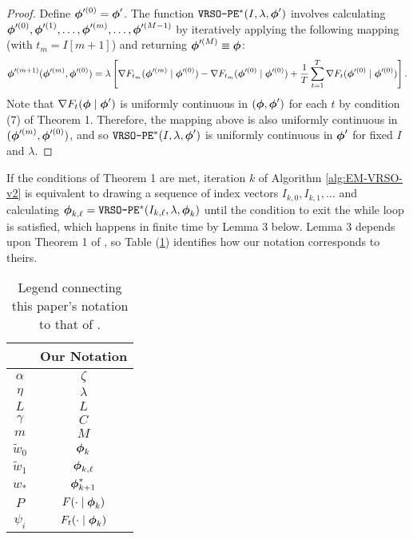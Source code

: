 \begin{proof}
    Define $\boldsymbol{\phi}'^{(0)} = \boldsymbol{\phi}'$. The function $\texttt{VRSO-PE}^*(I,\lambda,\boldsymbol{\phi}')$ involves calculating $\boldsymbol{\phi}'^{(0)}, \boldsymbol{\phi}'^{(1)}, \ldots, \boldsymbol{\phi}'^{(m)}, \ldots, \boldsymbol{\phi}'^{(M-1)}$ by iteratively applying the following mapping (with $t_m = I[m+1]$) and returning $\boldsymbol{\phi}'^{(M)} \equiv \boldsymbol{\phi}$:
    \begin{equation*}
        \boldsymbol{\phi}'^{(m+1)}(\boldsymbol{\phi}'^{(m)},\boldsymbol{\phi}'^{(0)}) = \lambda \left[\nabla F_{t_m}(\boldsymbol{\phi}'^{(m)} \mid \boldsymbol{\phi}'^{(0)}) - \nabla F_{t_m}(\boldsymbol{\phi}'^{(0)} \mid \boldsymbol{\phi}'^{(0)}) + \frac{1}{T}\sum_{t=1}^T\nabla F_{t}(\boldsymbol{\phi}'^{(0)} \mid \boldsymbol{\phi}'^{(0)}) \right].
    \end{equation*}
    Note that $\nabla F_t(\boldsymbol{\phi} \mid \boldsymbol{\phi}')$ is uniformly continuous in $(\boldsymbol{\phi},\boldsymbol{\phi}')$ for each $t$ by condition (7) of Theorem 1. Therefore, the mapping above is also uniformly continuous in $(\boldsymbol{\phi}'^{(m)},\boldsymbol{\phi}'^{(0)})$, and so $\texttt{VRSO-PE}^*(I,\lambda,\boldsymbol{\phi}')$ is uniformly continuous in $\boldsymbol{\phi}'$ for fixed $I$ and $\lambda$.
\end{proof}

If the conditions of Theorem 1 are met, iteration $k$ of Algorithm \ref{alg:EM-VRSO-v2} is equivalent to drawing a sequence of index vectors $I_{k,0},I_{k,1},\ldots$ and calculating $\boldsymbol{\phi}_{k,\ell} = \texttt{VRSO-PE}^*(I_{k,\ell},\lambda,\boldsymbol{\phi}_{k})$ until the condition to exit the while loop is satisfied, which happens in finite time by Lemma 3 below. Lemma 3 depends upon Theorem 1 of \citet{Johnson:2013}, so Table (\ref{tbl:notation}) identifies how our notation corresponds to theirs.
%
\begin{table}[]
\centering
\begin{tabular}{c|c}
\citet{Johnson:2013}                  & Our Notation                          \\ \hline
$\alpha$                              & $\zeta$                               \\
$\eta$                                & $\lambda$                             \\
$L$                                   & $L$                                   \\
$\gamma$                              & $C$                                   \\
$m$                                   & $M$                                   \\
$\tilde{w}_0$                         & $\boldsymbol{\phi}_{k}$                          \\
$\tilde{w}_1$                         & $\boldsymbol{\phi}_{k,\ell}$                     \\
$w_{*}$                               & $\boldsymbol{\phi}^*_{k+1}$                      \\
$P$                                   & $F(\cdot \mid \boldsymbol{\phi}_k)$              \\
$\psi_i$                              & $F_t(\cdot \mid \boldsymbol{\phi}_k)$                         
\end{tabular}
\caption{Legend connecting this paper's notation to that of \citet{Johnson:2013}.}
\label{tbl:notation}
\end{table}

